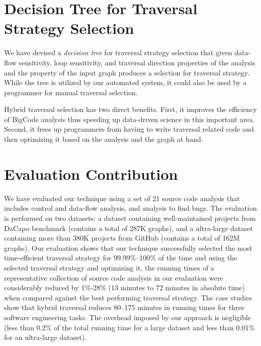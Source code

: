 \section{Decision Tree for Traversal Strategy Selection}
We have devised a {\em decision tree} for traversal strategy selection that 
given data-flow sensitivity, loop sensitivity, and traversal direction properties 
of the analysis and the \graphprop{} property of the input graph produces 
a selection for traversal strategy.
While the tree is utilized by our automated system, it could also be used by 
a programmer for manual traversal selection.

Hybrid traversal selection has two direct benefits. First, it improves the 
efficiency of BigCode analysis thus speeding up data-driven science in this important area.
Second, it frees up programmers from having to write traversal related code 
and then optimizing it based on the analysis and the graph at hand. 

\section{Evaluation Contribution}
We have evaluated our technique using a set of 21 source code analysis that
includes control and data-flow analysis, and analysis to find bugs. The
evaluation is performed on two datasets: a dataset containing well-maintained
projects from DaCapo benchmark (contains a total of 287K graphs), and a
ultra-large dataset containing more than 380K projects from GitHub (contains a
total of 162M graphs). Our evaluation shows that our technique successfully selected
the most time-efficient traversal strategy for 99.99\%--100\% of the time and
using the selected traversal strategy and optimizing it, the running times of a
representative collection of source code analysis in our evaluation
were considerably reduced by 1\%-28\% (13 minutes to 72 minutes in absolute time) when compared against the best performing traversal strategy. The case studies show that hybrid traversal reduces 80--175 minutes in running times for three software engineering tasks.
The overhead imposed by our approach is negligible (less than 0.2\% of the total 
running time for a large dataset and less than 0.01\% for an ultra-large dataset). 

